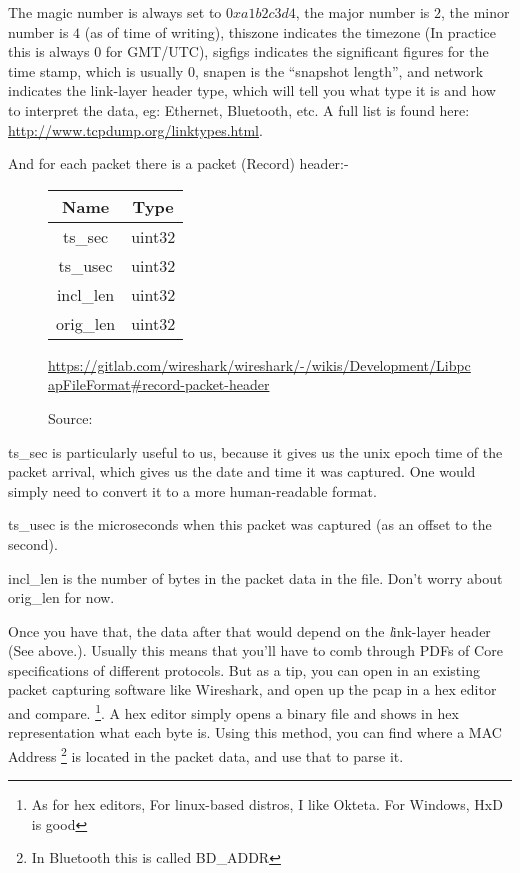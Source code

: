\documentclass[a4paper,10pt, twocolumn]{article}
\begin{document}
The magic number is always set to $0xa1b2c3d4$, the major number
is $2$, the minor number is $4$ (as of time of writing), thiszone
indicates the timezone (In practice this is always 0 for GMT/UTC),
sigfigs indicates the significant figures for the time stamp, which
is usually 0, snapen is the ``snapshot length'', and network indicates
the link-layer header type, which will tell you what type it is
and how to interpret the data, eg: Ethernet, Bluetooth, etc. A full list is found here:
\url{http://www.tcpdump.org/linktypes.html}.


And for each packet there is a packet (Record) header:-
\begin{figure}[htbp]
    \centering
    \begin{tabular} {| c | c |}
    \hline
    Name & Type \\
    \hline
    ts\_sec & uint32 \\
    \hline
    ts\_usec & uint32 \\
    \hline
    incl\_len & uint32 \\
    \hline
    orig\_len & uint32 \\
    \hline
    \end{tabular}
\caption{Source: }
\url{https://gitlab.com/wireshark/wireshark/-/wikis/Development/LibpcapFileFormat#record-packet-header}
\end{figure}

ts\_sec is particularly useful to us, because it gives us the unix epoch
time of the packet arrival, which gives us the date and time it was
captured. One would simply need to convert it to a more human-readable
format.

ts\_usec is the microseconds when this packet was captured (as
an offset to the second).

incl\_len is the number of bytes in the packet data in the file.
Don't worry about orig\_len for now.

Once you have that, the data after that would depend on the {\emph 
link-layer header} (See above.). Usually this means that you'll
have to comb through PDFs of Core specifications of different protocols.
But as a tip, you can open in an existing packet capturing software
like Wireshark, and open up the pcap in a hex editor and compare. 
\footnote{As for hex editors, For linux-based distros, I like Okteta.
For Windows, HxD is good}. A hex editor simply opens a binary file
and shows in hex representation what each byte is. Using this method,
you can find where a MAC Address \footnote{In Bluetooth this is
called BD\_ADDR} is located in the packet data, and use that to parse it.
\end{document}
